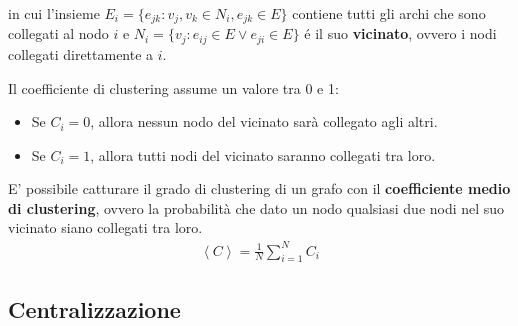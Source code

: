 in cui l'insieme $E_i = \{e_{jk} : v_j, v_k \in N_i, e_{jk} \in E\}$ contiene tutti gli archi che sono collegati al nodo $i$ e $N_i = \{v_j : e_{ij} \in E \lor e_{ji} \in E \}$ é il suo \textbf{vicinato}, ovvero i nodi collegati direttamente a $i$.

Il coefficiente di clustering assume un valore tra 0 e 1:
\begin{itemize}
  \item Se $C_i = 0$, allora nessun nodo del vicinato sarà collegato agli altri.
  \item Se $C_i = 1$, allora tutti nodi del vicinato saranno collegati tra loro.
\end{itemize}

E' possibile catturare il grado di clustering di un grafo con il \textbf{coefficiente medio di clustering}, ovvero la probabilità che dato un nodo qualsiasi due nodi nel suo vicinato siano collegati tra loro.
\begin{align*}
  \left\langle C \right\rangle = \frac{1}{N} \sum_{i=1}^N C_i
\end{align*}

\subsection*{Centralizzazione}
